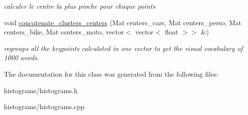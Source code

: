 \begin{DoxyCompactItemize}
\begin{DoxyCompactList}\small\item\em calculer le centre la plus proche pour chaque points \end{DoxyCompactList}\item 
\hypertarget{classhistograms_a0bdc6b52107722cbd118c37db1ef6b92}{
void \hyperlink{classhistograms_a0bdc6b52107722cbd118c37db1ef6b92}{concatenate\_\-clusters\_\-centers} (Mat centers\_\-cars, Mat centers\_\-perso, Mat centers\_\-bike, Mat centers\_\-moto, vector$<$ vector$<$ float $>$$>$ \&)}
\label{classhistograms_a0bdc6b52107722cbd118c37db1ef6b92}

\begin{DoxyCompactList}\small\item\em regroups all the keypoints calculated in one vector to get the visual vocabulary of 1000 words. \end{DoxyCompactList}\end{DoxyCompactItemize}


The documentation for this class was generated from the following files:\begin{DoxyCompactItemize}
\item 
histograms/histograms.h\item 
histograms/histograms.cpp\end{DoxyCompactItemize}
